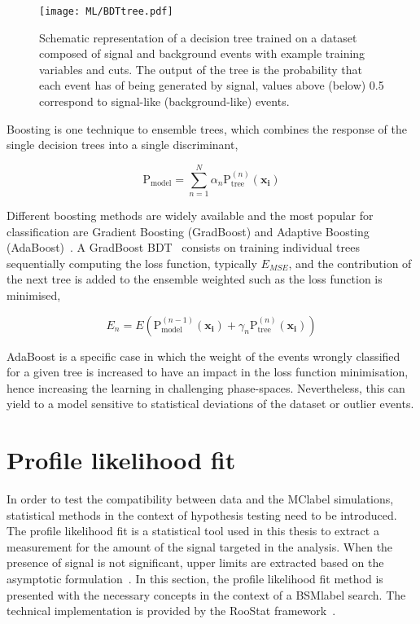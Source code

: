\begin{figure}[htbp]
    \RawFloats
    \begin{center}
    \texttt{[image: ML/BDTtree.pdf]}
    \caption{
        Schematic representation of a decision tree trained on a dataset composed of signal and background events with example training variables and cuts. The output of the tree is the probability that each event has of being generated by signal, values above (below) 0.5 correspond to signal-like (background-like) events.
    }
    \label{ML:BDT}
    \end{center}
\end{figure}

Boosting is one technique to ensemble trees, which combines the response of the single decision trees into a single discriminant,

\begin{equation}
    \text{P}_{\text{model}} = \sum_{n=1}^N \alpha_n \text{P}_{\text{tree}}^{(n)}(\mathbf{x_i})
\end{equation}

Different boosting methods are widely available and the most popular for classification are Gradient Boosting (GradBoost) and Adaptive Boosting (AdaBoost)~\cite{FREUND1997119}. A GradBoost BDT~\cite{Chen_2016} consists on training individual trees sequentially computing the loss function, typically $E_{MSE}$, and the contribution of the next tree is added to the ensemble weighted such as the loss function is minimised,

\begin{equation}
    E_n = E\left(\text{P}_{\text{model}}^(n-1)(\mathbf{x_i})+\gamma_n \text{P}_{\text{tree}}^{(n)}(\mathbf{x_i})\right)
\end{equation}

AdaBoost is a specific case in which the weight of the events wrongly classified for a given tree is increased to have an impact in the loss function minimisation, hence increasing the learning in challenging phase-spaces. Nevertheless, this can yield to a model sensitive to statistical deviations of the dataset or outlier events.


\section{Profile likelihood fit}
\label{sec:profilelikelihoodfit}
In order to test the compatibility between data and the \acrshort{MClabel} simulations, statistical methods in the context of hypothesis testing need to be introduced. The profile likelihood fit is a statistical tool used in this thesis to extract a measurement for the amount of the signal targeted in the analysis. When the presence of signal is not significant, upper limits are extracted based on the asymptotic formulation~\cite{Cowan_2011}. In this section, the profile likelihood fit method is presented with the necessary concepts in the context of a \acrshort{BSMlabel} search.
The technical implementation is provided by the RooStat framework~\cite{10.48550/arxiv.1009.1003}.

